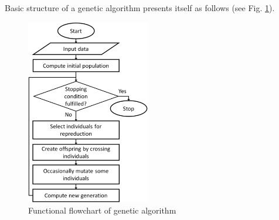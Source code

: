 \documentclass[preprint,12pt]{elsarticle}
\begin{document}


Basic structure of a genetic algorithm presents itself as follows (see Fig. \ref{fig:block}).

\begin{figure}[ht!]
\centering
\includegraphics[width=0.48\textwidth]{wykresy/block.png}
\caption{Functional flowchart of genetic algorithm}
\label{fig:block}
\end{figure}
\end{document}
